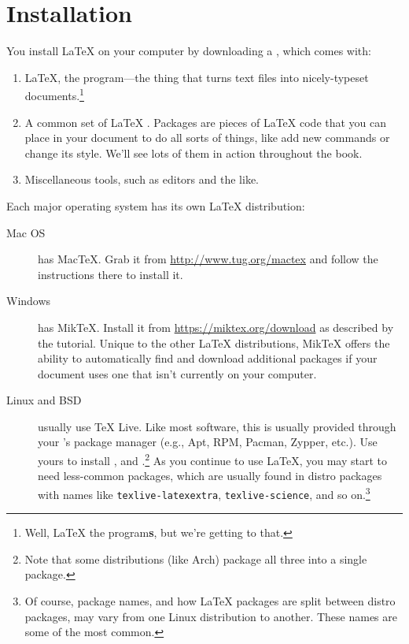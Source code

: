 \chapter{Installation}

You install \LaTeX{} on your computer by downloading a ,
which comes with:
\begin{enumerate}
\item \LaTeX, the program---the thing that turns text files into nicely-typeset
    documents.\footnote{Well, \LaTeX{} the program\textbf{s},
but we're getting to that.}
\item A common set of \LaTeX{} .
    Packages are pieces of \LaTeX{} code that you can place in your document to
    do all sorts of things, like add new commands or change its style.
    We'll see lots of them in action throughout the book.
\item Miscellaneous tools, such as editors and the like.
\end{enumerate}
Each major operating system has its own \LaTeX{} distribution:
\begin{description}
\item[Mac OS] has Mac\TeX. Grab it from \url{http://www.tug.org/mactex}
    and follow the instructions there to install it.

\item[Windows] has Mik\TeX.
    Install it from \url{https://miktex.org/download}
    as described by the tutorial.
    Unique to the other \LaTeX{} distributions,
    Mik\TeX{} offers the ability to automatically find and download additional
    packages if your document uses one that isn't currently on your computer.

\item[Linux and BSD] usually use \TeX{} Live.
    Like most software, this is usually provided through your
    's package manager (e.g., Apt, RPM, Pacman, Zypper, etc.).
    Use yours to install ,
     and .\punckern\footnote{%
    Note that some distributions (like Arch) package all three into a
    single  package.}
    As you continue to use \LaTeX, you may start to need less-common packages,
    which are usually found in distro packages with names like
    \texttt{texlive-latexextra}, \texttt{texlive-science},
    and so on.\punckern\footnote{Of
    course, package names, and how \LaTeX{} packages are split between
    distro packages, may vary from one Linux distribution to another.
    These names are some of the most common.}
\end{description}

